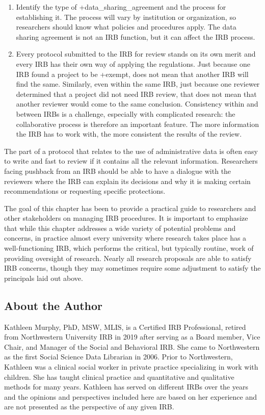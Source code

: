 \documentclass[
]{WileySix}
\begin{document}
\begin{enumerate}
\item
  Identify the type of +data\_sharing\_agreement\textbar{} and the process for establishing it. The process will vary by institution or organization, so researchers should know what policies and procedures apply. The data sharing agreement is not an IRB function, but it can affect the IRB process.
\item
  Every protocol submitted to the IRB for review stands on its own merit and every IRB has their own way of applying the regulations. Just because one IRB found a project to be +exempt\textbar, does not mean that another IRB will find the same. Similarly, even within the same IRB, just because one reviewer determined that a project did not need IRB review, that does not mean that another reviewer would come to the same conclusion. Consistency within and between IRBs is a challenge, especially with complicated research: the collaborative process is therefore an important feature. The more information the IRB has to work with, the more consistent the results of the review.
\end{enumerate}

The part of a protocol that relates to the use of administrative data is often easy to write and fast to review if it contains all the relevant information. Researchers facing pushback from an IRB should be able to have a dialogue with the reviewers where the IRB can explain its decisions and why it is making certain recommendations or requesting specific protections.

The goal of this chapter has been to provide a practical guide to researchers and other stakeholders on managing IRB procedures. It is important to emphasize that while this chapter addresses a wide variety of potential problems and concerns, in practice almost every university where research takes place has a well-functioning IRB, which performs the critical, but typically routine, work of providing oversight of research. Nearly all research proposals are able to satisfy IRB concerns, though they may sometimes require some adjustment to satisfy the principals laid out above.

\hypertarget{about-the-author-1}{%
\subsection*{About the Author}\label{about-the-author-1}}

Kathleen Murphy, PhD, MSW, MLIS, is a Certified IRB Professional, retired from Northwestern University IRB in 2019 after serving as a Board member, Vice Chair, and Manager of the Social and Behavioral IRB. She came to Northwestern as the first Social Science Data Librarian in 2006. Prior to Northwestern, Kathleen was a clinical social worker in private practice specializing in work with children. She has taught clinical practice and quantitative and qualitative methods for many years. Kathleen has served on different IRBs over the years and the opinions and perspectives included here are based on her experience and are not presented as the perspective of any given IRB.
\end{document}
